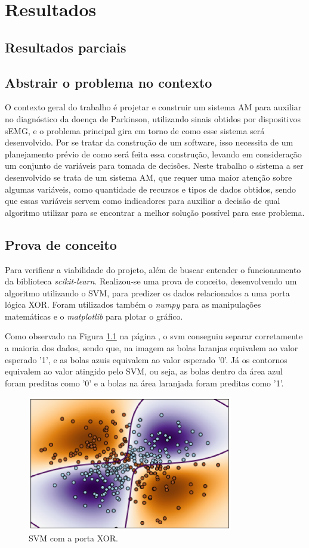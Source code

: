 \chapter{Resultados}
\label{ch:Resultados}
\section{Resultados parciais}
\section{Abstrair o problema no contexto}
O contexto geral do trabalho é projetar e construir um sistema AM para auxiliar no diagnóstico da doença de Parkinson, utilizando sinais obtidos por dispositivos sEMG, e o problema principal gira em torno de como esse sistema será desenvolvido. Por se tratar da construção de um software, isso necessita de um planejamento prévio de como será feita essa construção, levando em consideração um conjunto de variáveis para tomada de decisões. Neste trabalho o sistema a ser desenvolvido se trata de um sistema AM, que requer uma maior atenção sobre algumas variáveis, como quantidade de recursos e tipos de dados obtidos, sendo que essas variáveis servem como indicadores para auxiliar a decisão de qual algoritmo utilizar para se encontrar a melhor solução possível para esse problema.

\section{Prova de conceito}
Para verificar a viabilidade do projeto, além de buscar entender o funcionamento da biblioteca \textit{scikit-learn}. Realizou-se uma prova de conceito, desenvolvendo um algoritmo utilizando o SVM, para predizer os dados relacionados a uma porta lógica XOR. Foram utilizados também o \textit{numpy} para as manipulações matemáticas e o \textit{matplotlib} para plotar o gráfico.

Como observado na Figura \ref{svmxor} na página \pageref{svmxor}, o svm conseguiu separar corretamente a maioria dos dados, sendo que, na imagem as bolas laranjas equivalem ao valor esperado '1', e as bolas azuis equivalem ao valor esperado '0'. Já os contornos equivalem ao valor atingido pelo SVM, ou seja, as bolas dentro da área azul foram preditas como '0' e  a bolas na área laranjada foram preditas como '1'.

\begin{figure}[!htb]
	\centering
	\includegraphics[width=0.8\textwidth]{figuras/xor.eps}
	\caption{SVM com a porta XOR.}
	\label{svmxor}
\end{figure}